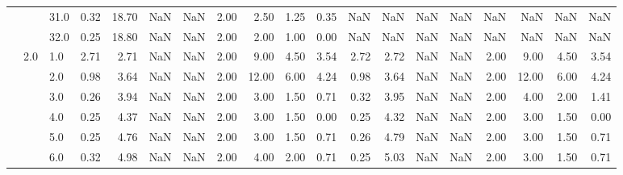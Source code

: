 \begin{tabular}{lllrrrrrrrrrrrrrrrr}
       &     & 31.0 &      0.32 &      18.70 &               NaN &                NaN & 2.00 &   2.50 &             1.25 &                         0.35 &       NaN &        NaN &               NaN &                NaN &  NaN &    NaN &              NaN &                          NaN \\
       &     & 32.0 &      0.25 &      18.80 &               NaN &                NaN & 2.00 &   2.00 &             1.00 &                         0.00 &       NaN &        NaN &               NaN &                NaN &  NaN &    NaN &              NaN &                          NaN \\
       & 2.0 & 1.0  &      2.71 &       2.71 &               NaN &                NaN & 2.00 &   9.00 &             4.50 &                         3.54 &      2.72 &       2.72 &               NaN &                NaN & 2.00 &   9.00 &             4.50 &                         3.54 \\
       &     & 2.0  &      0.98 &       3.64 &               NaN &                NaN & 2.00 &  12.00 &             6.00 &                         4.24 &      0.98 &       3.64 &               NaN &                NaN & 2.00 &  12.00 &             6.00 &                         4.24 \\
       &     & 3.0  &      0.26 &       3.94 &               NaN &                NaN & 2.00 &   3.00 &             1.50 &                         0.71 &      0.32 &       3.95 &               NaN &                NaN & 2.00 &   4.00 &             2.00 &                         1.41 \\
       &     & 4.0  &      0.25 &       4.37 &               NaN &                NaN & 2.00 &   3.00 &             1.50 &                         0.00 &      0.25 &       4.32 &               NaN &                NaN & 2.00 &   3.00 &             1.50 &                         0.00 \\
       &     & 5.0  &      0.25 &       4.76 &               NaN &                NaN & 2.00 &   3.00 &             1.50 &                         0.71 &      0.26 &       4.79 &               NaN &                NaN & 2.00 &   3.00 &             1.50 &                         0.71 \\
       &     & 6.0  &      0.32 &       4.98 &               NaN &                NaN & 2.00 &   4.00 &             2.00 &                         0.71 &      0.25 &       5.03 &               NaN &                NaN & 2.00 &   3.00 &             1.50 &                         0.71 \\

\end{tabular}
